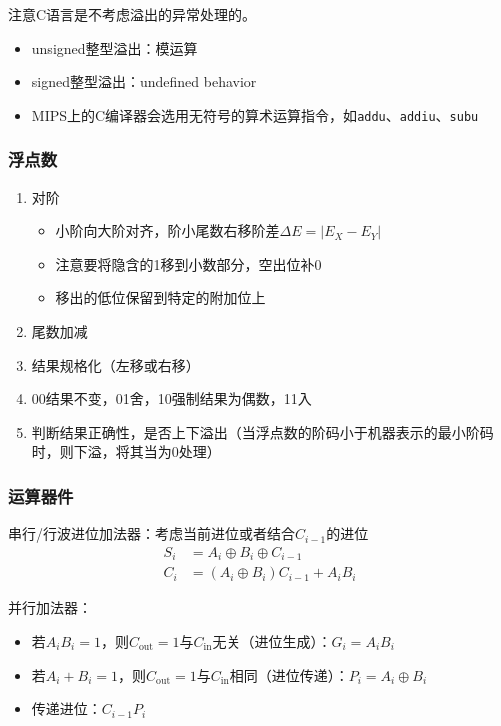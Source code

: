 注意C语言是不考虑溢出的异常处理的。
\begin{itemize}
	\item unsigned整型溢出：模运算
	\item signed整型溢出：undefined behavior
	\item MIPS上的C编译器会选用无符号的算术运算指令，如\verb'addu'、\verb'addiu'、\verb'subu'
\end{itemize}

\subsubsection{浮点数}
\begin{enumerate}
	\item 对阶
	\begin{itemize}
		\item 小阶向大阶对齐，阶小尾数右移阶差$\Delta E=|E_X-E_Y|$
		\item 注意要将隐含的1移到小数部分，空出位补0
		\item 移出的低位保留到特定的附加位上
	\end{itemize}
	\item 尾数加减
	\item 结果规格化（左移或右移）
	\item 00结果不变，01舍，10强制结果为偶数，11入
	\item 判断结果正确性，是否上下溢出（当浮点数的阶码小于机器表示的最小阶码时，则下溢，将其当为0处理）
\end{enumerate}

\subsubsection{运算器件}
串行/行波进位加法器：考虑当前进位或者结合$C_{i-1}$的进位
\[\begin{aligned}
S_i&=A_i\oplus B_i\oplus C_{i-1}\\
C_i&=(A_i\oplus B_i)C_{i-1}+A_iB_i
\end{aligned}\]

并行加法器：
\begin{itemize}
	\item 若$A_iB_i=1$，则$C_{\text{out}}=1$与$C_{\text{in}}$无关（进位生成）：$G_i=A_iB_i$
	\item 若$A_i+B_i=1$，则$C_{\text{out}}=1$与$C_{\text{in}}$相同（进位传递）：$P_i=A_i\oplus B_i$
	\item 传递进位：$C_{i-1}P_i$
\end{itemize}

